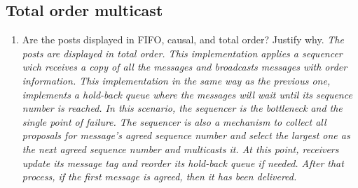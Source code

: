 \subsection{Total order multicast}
\renewcommand{\labelenumi}{\roman{enumi}}
\begin{enumerate}
\item Are the posts displayed in FIFO, causal, and total order? Justify why.
\textit{\newline The posts are displayed in total order. This implementation applies a sequencer wich  receives a copy of all the messages and broadcasts messages with order information. This implementation in the same way as the previous one, implements a hold-back queue where the messages will wait until  its sequence number is reached. 
\newline In this scenario, the sequencer is the bottleneck and the single point of failure.
\newline The sequencer is also a mechanism to collect all proposals for message’s agreed sequence number and select the largest one as the next agreed sequence number and multicasts it. 
\newline At this point, receivers update its message tag and reorder its hold-back queue if needed.
\newline After that process, if the first message is agreed, then it has been delivered.}
\end{enumerate}
